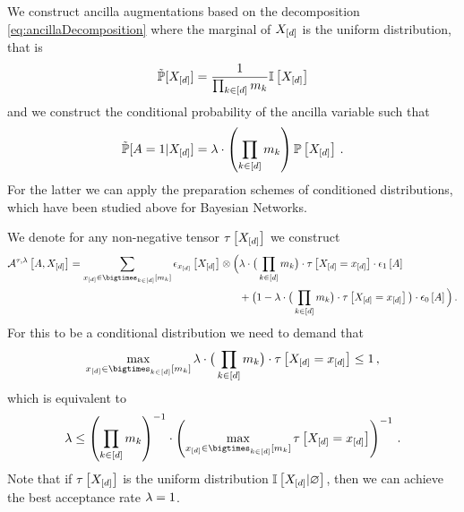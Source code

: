 We construct ancilla augmentations based on the decomposition \eqref{eq:ancillaDecomposition} where the marginal of $X_{[d]}$ is the uniform distribution, that is
\begin{align*}
    \tilde{\mathbb{P}}[X_{[d]}]
    = \frac{1}{\prod_{k\in[d]}m_{k}}
    \mathbb{I}\left[X_{[d]}\right]
\end{align*}
and we construct the conditional probability of the ancilla variable such that
\begin{align*}
    \tilde{\mathbb{P}}[A=1|X_{[d]}]
    = \lambda \cdot \left(\prod_{k\in[d]}m_{k}\right) \mathbb{P}\left[X_{[d]}\right] \, .
\end{align*}
For the latter we can apply the preparation schemes of conditioned distributions, which have been studied above for Bayesian Networks.

We denote for any non-negative tensor $\tau\left[X_{[d]}\right]$ we construct
\begin{align*}
    \anaugmentationofat{\hypercore,\acceptanceprob}{\avariable,\shortcatvariables}
    =
    \sum_{\shortcatindicesin} \onehotmapofat{\shortcatindices}{\shortcatvariables}
    \otimes \Big(&
    \acceptanceprob \cdot \big(\prod_{\catenumeratorin}\catdimof{\catenumerator}\big) \cdot \hypercoreat{\indexedshortcatvariables} \cdot \tbasisat{\avariable} \\
    &+ \big(1- \acceptanceprob \cdot \big(\prod_{\catenumeratorin}\catdimof{\catenumerator}\big) \cdot \hypercoreat{\indexedshortcatvariables}\big) \cdot \fbasisat{\avariable}
    \Big) \, .
\end{align*}
For this to be a conditional distribution we need to demand that
\begin{align*}
    \max_{\shortcatindicesin} \acceptanceprob \cdot \big(\prod_{\catenumeratorin}\catdimof{\catenumerator}\big) \cdot \hypercoreat{\indexedshortcatvariables} \leq 1 \, ,
\end{align*}
which is equivalent to
\begin{align*}
    \acceptanceprob \leq \left(\prod_{\catenumeratorin}\catdimof{\catenumerator}\right)^{-1}\cdot\left(\max_{\shortcatindicesin}\hypercoreat{\indexedshortcatvariables}\right)^{-1} \, .
\end{align*}
Note that if $\tau\left[X_{[d]}\right]$ is the uniform distribution $\mathbb{I}\left[X_{[d]}|\varnothing\right]$, then we can achieve the best acceptance rate $\lambda=1$.

